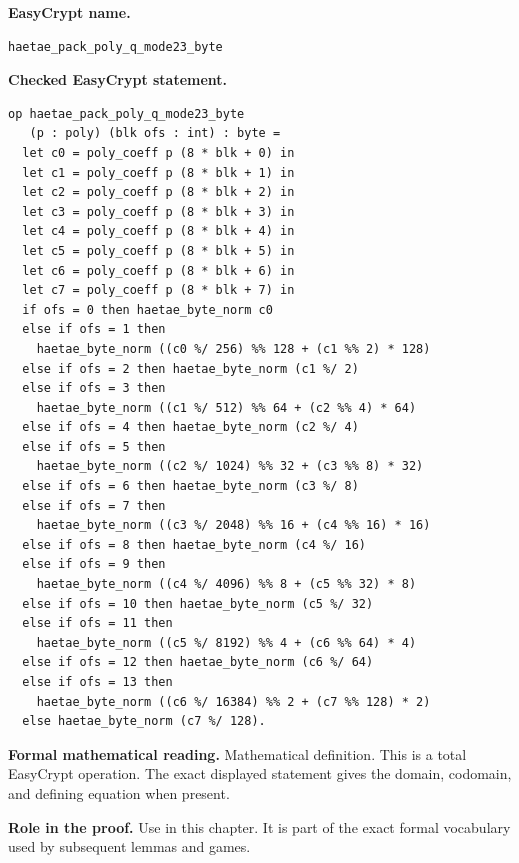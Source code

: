 \begin{formaldefinition}
\noindent\textbf{EasyCrypt name.}
\begin{lstlisting}[language=EasyCrypt,basicstyle=\ttfamily\scriptsize]
haetae_pack_poly_q_mode23_byte
\end{lstlisting}
\noindent\textbf{Checked EasyCrypt statement.}
\begin{lstlisting}[language=EasyCrypt,basicstyle=\ttfamily\scriptsize]
op haetae_pack_poly_q_mode23_byte
   (p : poly) (blk ofs : int) : byte =
  let c0 = poly_coeff p (8 * blk + 0) in
  let c1 = poly_coeff p (8 * blk + 1) in
  let c2 = poly_coeff p (8 * blk + 2) in
  let c3 = poly_coeff p (8 * blk + 3) in
  let c4 = poly_coeff p (8 * blk + 4) in
  let c5 = poly_coeff p (8 * blk + 5) in
  let c6 = poly_coeff p (8 * blk + 6) in
  let c7 = poly_coeff p (8 * blk + 7) in
  if ofs = 0 then haetae_byte_norm c0
  else if ofs = 1 then
    haetae_byte_norm ((c0 %/ 256) %% 128 + (c1 %% 2) * 128)
  else if ofs = 2 then haetae_byte_norm (c1 %/ 2)
  else if ofs = 3 then
    haetae_byte_norm ((c1 %/ 512) %% 64 + (c2 %% 4) * 64)
  else if ofs = 4 then haetae_byte_norm (c2 %/ 4)
  else if ofs = 5 then
    haetae_byte_norm ((c2 %/ 1024) %% 32 + (c3 %% 8) * 32)
  else if ofs = 6 then haetae_byte_norm (c3 %/ 8)
  else if ofs = 7 then
    haetae_byte_norm ((c3 %/ 2048) %% 16 + (c4 %% 16) * 16)
  else if ofs = 8 then haetae_byte_norm (c4 %/ 16)
  else if ofs = 9 then
    haetae_byte_norm ((c4 %/ 4096) %% 8 + (c5 %% 32) * 8)
  else if ofs = 10 then haetae_byte_norm (c5 %/ 32)
  else if ofs = 11 then
    haetae_byte_norm ((c5 %/ 8192) %% 4 + (c6 %% 64) * 4)
  else if ofs = 12 then haetae_byte_norm (c6 %/ 64)
  else if ofs = 13 then
    haetae_byte_norm ((c6 %/ 16384) %% 2 + (c7 %% 128) * 2)
  else haetae_byte_norm (c7 %/ 128).
\end{lstlisting}
\noindent\textbf{Formal mathematical reading.}
Mathematical definition. This is a total EasyCrypt operation.  The exact displayed statement gives the domain, codomain, and defining equation when present.

\noindent\textbf{Role in the proof.}
Use in this chapter. It is part of the exact formal vocabulary used by subsequent lemmas and games.

\end{formaldefinition}

